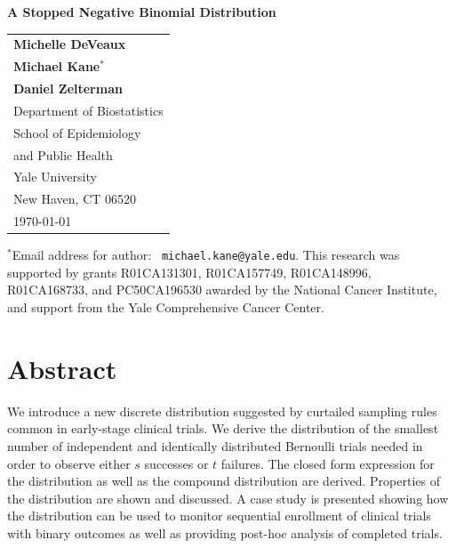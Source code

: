 \documentclass[12pt]{article}         %
\begin{document}
\thispagestyle{empty}
\begin{center}
\vspace*{\fill}

{\Large\bf A Stopped Negative Binomial Distribution} \\ [1ex]

\vspace*{1.25in}
\begin{tabular}{l} 
 {\bf Michelle DeVeaux} \\
 {\bf Michael Kane${}^*$} \\
 {\bf Daniel Zelterman}  \\[.1in]

 Department of Biostatistics \\
 School of Epidemiology  \\
 \hspace*{.15in} and Public Health  \\
 Yale University       \\
 New Haven, CT  06520  \\[.2in]

\today
\end{tabular}
\end{center}

\vspace*{\fill}

\noindent${}^*$Email address for author: {\tt
michael.kane@yale.edu}.  
This research was supported by grants R01CA131301, R01CA157749, R01CA148996, 
R01CA168733, and PC50CA196530 awarded by the National Cancer Institute, and 
support from the Yale Comprehensive Cancer Center.


\newpage
\thispagestyle{empty}

\section*    {\bf   Abstract}

We introduce a new discrete distribution suggested by curtailed 
sampling rules common in early-stage clinical trials. We derive the 
distribution of the smallest number of independent and identically 
distributed Bernoulli trials 
needed in order to observe either $s$ successes or $t$ failures. The closed 
form expression for the distribution as well as the compound distribution are 
derived. Properties of the distribution are shown and discussed. A case study 
is presented showing how the distribution can be used to monitor sequential 
enrollment of clinical trials with binary outcomes as well as providing 
post-hoc analysis of completed trials.
\end{document}
